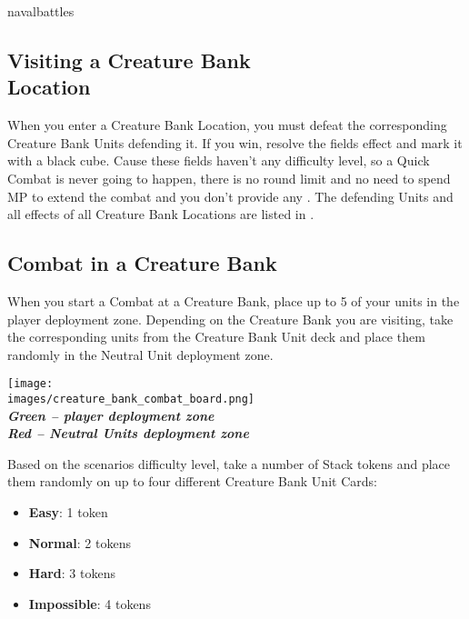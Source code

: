\begin{expansion}[before=\vspace*{-11mm}]{navalbattles}
\begin{multicols*}{2}
  \subsection*{Visiting a Creature Bank\\Location}
  When you enter a Creature Bank Location, you must defeat the corresponding Creature Bank Units defending it.
  If you win, resolve the fields effect and mark it with a black cube.
  Cause these fields haven't any difficulty level, so a Quick Combat is never going to happen, there is no round limit and no need to spend MP to extend the combat and you don't provide any .
  The defending Units and all effects of all Creature Bank Locations are listed in .

  \subsection*{Combat in a Creature Bank}
  When you start a Combat at a Creature Bank, place up to 5 of your units in the player deployment zone.
  Depending on the Creature Bank you are visiting, take the corresponding units from the Creature Bank Unit deck and place them randomly in the Neutral Unit deployment zone.
  \bigskip
  \begin{center}
    \texttt{[image: \\images/creature\_bank\_combat\_board.png]}\\
    \textbf{\footnotesize\textit{\textcolor{darkcandyapplered}{Green -- player deployment zone}}}\\
    \textbf{\footnotesize\textit{\textcolor{darkcandyapplered}{Red -- Neutral Units deployment zone}}}\\
  \end{center}
  \bigskip

  Based on the scenarios difficulty level, take a number of Stack tokens and place them randomly on up to four different Creature Bank Unit Cards:
  \begin{itemize}[itemsep=0.4em, parsep=0pt, topsep=5pt]
    \item \textbf{Easy}: 1 token
    \item \textbf{Normal}: 2 tokens
    \item \textbf{Hard}: 3 tokens
    \item \textbf{Impossible}: 4 tokens
  \end{itemize}

  \end{multicols*}
\end{expansion}


